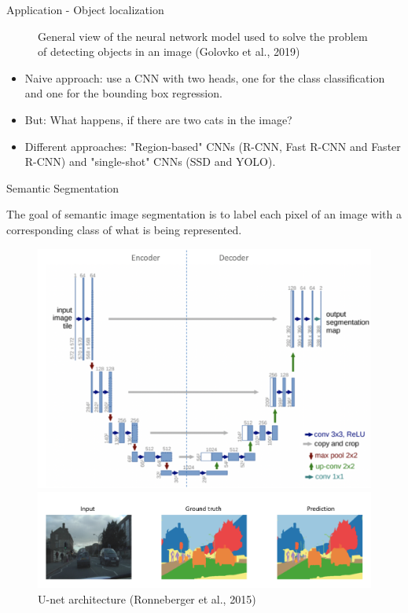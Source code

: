 \begin{vbframe}{Application - Object localization}
\begin{figure}
            \caption{General view of the neural network model used to solve the problem of detecting objects in an image (Golovko et al., 2019)}
            \end{figure}
            \begin{itemize}
            \item Naive approach: use a CNN with two heads, one for the class classification and one for the bounding box regression.
            \item But: What happens, if there are two cats in the image?
                \item Different approaches: "Region-based" CNNs (R-CNN, Fast R-CNN and Faster R-CNN) and "single-shot" CNNs (SSD and YOLO).
            \end{itemize}

            \end{vbframe}
         
\begin{vbframe}{Semantic Segmentation}

The goal of semantic image segmentation is to label each pixel of an image with a corresponding class of what is being represented. 

\begin{figure}
\centering
\begin{minipage}{.5\textwidth}
  \centering
  \includegraphics[width=.9\linewidth]{figure/unet.png}
\end{minipage}%
\begin{minipage}{.5\textwidth}
  \centering
  \includegraphics[width=.9\linewidth]{figure/semantic_segmentation.png}
\end{minipage}
\caption{U-net architecture (Ronneberger et al., 2015)}
\end{figure}

\end{vbframe}

